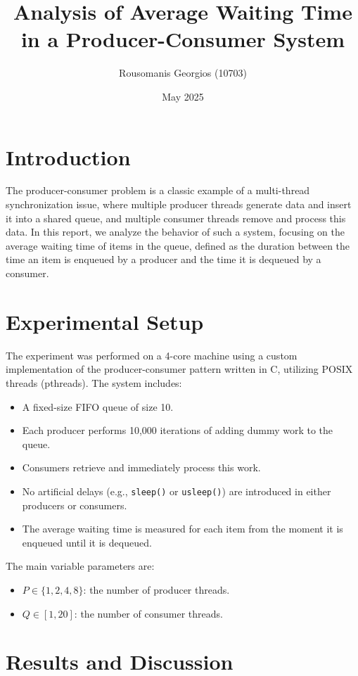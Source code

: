 \documentclass[11pt]{article}
\title{Analysis of Average Waiting Time in a Producer-Consumer System}
\author{Rousomanis Georgios (10703)}
\date{May 2025}
\begin{document}
\maketitle

\section{Introduction}

The producer-consumer problem is a classic example of a multi-thread synchronization issue, 
where multiple producer threads generate data and insert it into a shared queue, and multiple 
consumer threads remove and process this data. In this report, we analyze the behavior of such 
a system, focusing on the average waiting time of items in the queue, defined as the duration 
between the time an item is enqueued by a producer and the time it is dequeued by a consumer.

\section{Experimental Setup}

The experiment was performed on a 4-core machine using a custom implementation of the 
producer-consumer pattern written in C, utilizing POSIX threads (pthreads). The system includes:
\begin{itemize}
    \item A fixed-size FIFO queue of size 10.
    \item Each producer performs 10,000 iterations of adding dummy work to the queue.
    \item Consumers retrieve and immediately process this work.
    \item No artificial delays (e.g., \texttt{sleep()} or \texttt{usleep()}) are introduced in 
    either producers or consumers.
    \item The average waiting time is measured for each item from the moment it is enqueued until 
    it is dequeued.
\end{itemize}

The main variable parameters are:
\begin{itemize}
    \item \( P \in \{1, 2, 4, 8\} \): the number of producer threads.
    \item \( Q \in [1, 20] \): the number of consumer threads.
\end{itemize}

\section{Results and Discussion}
\end{document}
